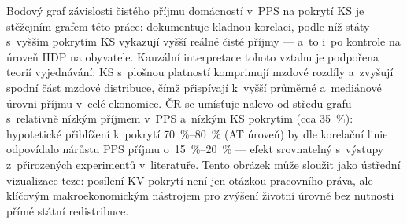 Bodový graf závislosti čistého příjmu domácností v~\ac{PPS} na pokrytí \ac{KS} je stěžejním grafem této práce: dokumentuje kladnou korelaci, podle níž státy s~vyšším pokrytím \ac{KS} vykazují vyšší reálné čisté příjmy --- a~to i~po kontrole na úroveň \ac{HDP} na obyvatele.
Kauzální interpretace tohoto vztahu je podpořena teorií vyjednávání: \ac{KS} s~plošnou platností komprimují mzdové rozdíly a~zvyšují spodní část mzdové distribuce, čímž přispívají k~vyšší průměrné a~mediánové úrovni příjmu v~celé ekonomice.
ČR se umísťuje nalevo od středu grafu s~relativně nízkým příjmem v~\ac{PPS} a~nízkým \ac{KS} pokrytím (cca \SI{35}{\percent}): hypotetické přiblížení k~pokrytí \SIrange{70}{80}{\percent} (AT úroveň) by dle korelační linie odpovídalo nárůstu \ac{PPS} příjmu o~\SIrange{15}{20}{\percent} --- efekt srovnatelný s~výstupy z~přirozených experimentů v~literatuře.
Tento obrázek může sloužit jako ústřední vizualizace teze: posílení \ac{KV} pokrytí není jen otázkou pracovního práva, ale klíčovým makroekonomickým nástrojem pro zvýšení životní úrovně bez nutnosti přímé státní redistribuce.


